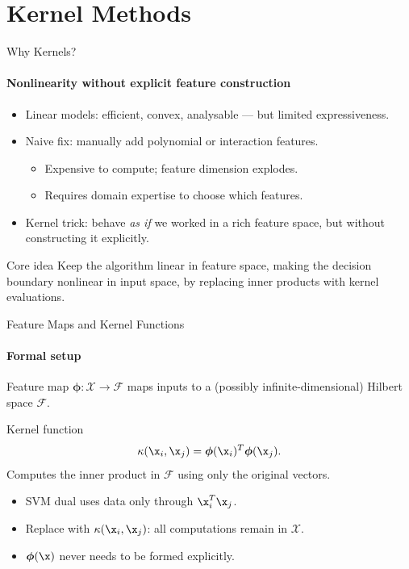 \section{Kernel Methods}

\begin{frame}{Why Kernels?}
  \framesubtitle{Nonlinearity without explicit feature construction}
  \begin{itemize}
    \item Linear models: efficient, convex, analysable — but limited expressiveness.
    \item Naive fix: manually add polynomial or interaction features.
      \begin{itemize}
        \item Expensive to compute; feature dimension explodes.
        \item Requires domain expertise to choose which features.
      \end{itemize}
    \item \alert{Kernel trick}: behave \emph{as if} we worked in a rich feature space,
          but without constructing it explicitly.
  \end{itemize}
  \begin{block}{Core idea}
    Keep the algorithm \alert{linear in feature space}, making the decision boundary
    \alert{nonlinear in input space}, by replacing inner products with kernel evaluations.
  \end{block}
\end{frame}

\begin{frame}{Feature Maps and Kernel Functions}
  \framesubtitle{Formal setup}
  \begin{block}{Feature map}
    $\boldsymbol{\phi}: \mathcal{X} \to \mathcal{F}$ maps inputs to a (possibly infinite-dimensional)
    Hilbert space $\mathcal{F}$.
  \end{block}
  \begin{block}{Kernel function}
    \[
      \kappa(\x_i, \x_j) = \boldsymbol{\phi}(\x_i)^T \boldsymbol{\phi}(\x_j).
    \]
    Computes the inner product in $\mathcal{F}$ using only the original vectors.
  \end{block}
  \begin{itemize}
    \item SVM dual uses data only through $\x_i^T\x_j$.
    \item Replace with $\kappa(\x_i,\x_j)$: all computations remain in $\mathcal{X}$.
    \item $\boldsymbol{\phi}(\x)$ \alert{never needs to be formed explicitly}.
  \end{itemize}
\end{frame}

